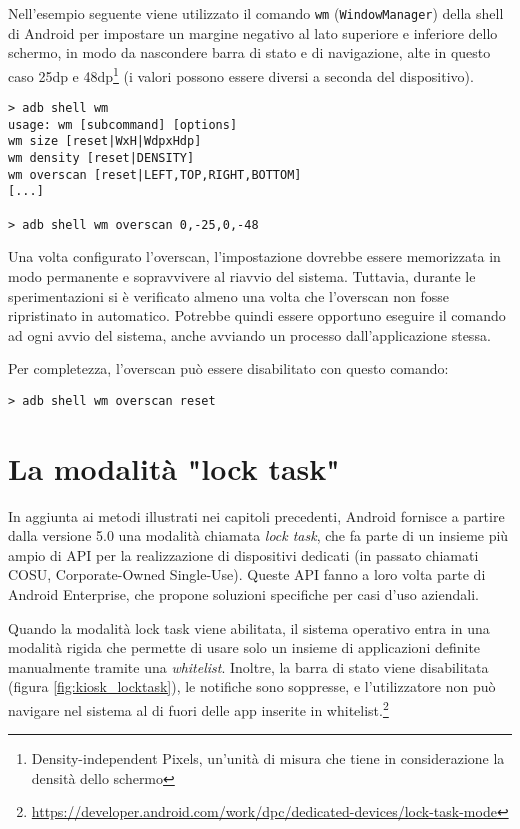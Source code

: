 Nell'esempio seguente viene utilizzato il comando \texttt{wm} (\texttt{WindowManager}) della shell di Android per impostare un margine negativo al lato superiore e inferiore dello schermo, in modo da nascondere barra di stato e di navigazione, alte in questo caso 25dp e 48dp\footnote{Density-independent Pixels, un'unità di misura che tiene in considerazione la densità dello schermo} (i valori possono essere diversi a seconda del dispositivo).

\begin{verbatim}
> adb shell wm
usage: wm [subcommand] [options]
wm size [reset|WxH|WdpxHdp]
wm density [reset|DENSITY]
wm overscan [reset|LEFT,TOP,RIGHT,BOTTOM]
[...]

> adb shell wm overscan 0,-25,0,-48
\end{verbatim}

Una volta configurato l'overscan, l'impostazione dovrebbe essere memorizzata in modo permanente e sopravvivere al riavvio del sistema. Tuttavia, durante le sperimentazioni si è verificato almeno una volta che l'overscan non fosse ripristinato in automatico. Potrebbe quindi essere opportuno eseguire il comando ad ogni avvio del sistema, anche avviando un processo dall'applicazione stessa.

Per completezza, l'overscan può essere disabilitato con questo comando:

\begin{verbatim}
> adb shell wm overscan reset
\end{verbatim}


\section{La modalità "lock task"}
\label{sec:kiosk_locktask}

In aggiunta ai metodi illustrati nei capitoli precedenti, Android fornisce a partire dalla versione 5.0 una modalità chiamata \emph{lock task}, che fa parte di un insieme più ampio di API per la realizzazione di dispositivi dedicati (in passato chiamati COSU, Corporate-Owned Single-Use). Queste API fanno a loro volta parte di Android Enterprise, che propone soluzioni specifiche per casi d'uso aziendali.

Quando la modalità lock task viene abilitata, il sistema operativo entra in una modalità rigida che permette di usare solo un insieme di applicazioni definite manualmente tramite una \emph{whitelist}. Inoltre, la barra di stato viene disabilitata (figura \ref{fig:kiosk_locktask}), le notifiche sono soppresse, e l'utilizzatore non può navigare nel sistema al di fuori delle app inserite in whitelist.\footnote{\url{https://developer.android.com/work/dpc/dedicated-devices/lock-task-mode}}


